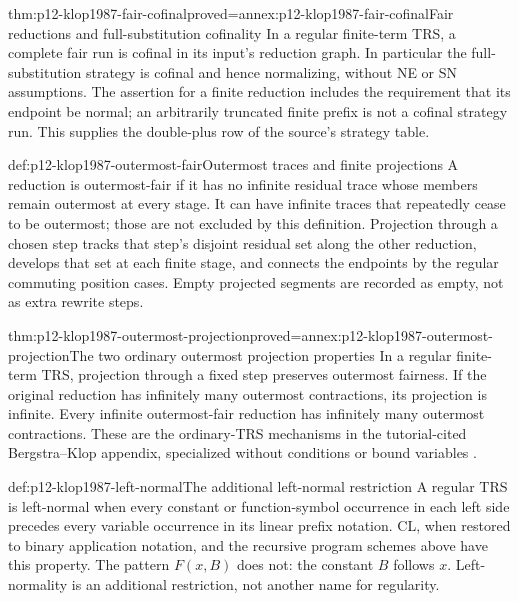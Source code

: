 \begin{hbtheorem}{thm:p12-klop1987-fair-cofinal}{proved=annex:p12-klop1987-fair-cofinal}{Fair reductions and full-substitution cofinality}
In a regular finite-term TRS, a complete fair run is cofinal in its input's
reduction graph. In particular the full-substitution strategy is cofinal
and hence normalizing, without NE or SN assumptions. The assertion for
a finite reduction includes the requirement that its endpoint be normal;
an arbitrarily truncated finite prefix is not a cofinal strategy run.
This supplies the double-plus row of the source's strategy table.
\end{hbtheorem}

\begin{hbdefinition}{def:p12-klop1987-outermost-fair}{Outermost traces and finite projections}
A reduction is outermost-fair if it has no infinite residual trace whose
members remain outermost at every stage. It can have infinite traces
that repeatedly cease to be outermost; those are not excluded by this
definition. Projection through a chosen step tracks that step's disjoint
residual set along the other reduction, develops that set at each finite
stage, and connects the endpoints by the regular commuting position cases.
Empty projected segments are recorded as empty, not as extra rewrite steps.
\end{hbdefinition}

\begin{hblemma}{thm:p12-klop1987-outermost-projection}{proved=annex:p12-klop1987-outermost-projection}{The two ordinary outermost projection properties}
In a regular finite-term TRS, projection through a fixed step preserves
outermost fairness. If the original reduction has infinitely many
outermost contractions, its projection is infinite. Every infinite
outermost-fair reduction has infinitely many outermost contractions.
These are the ordinary-TRS mechanisms in the tutorial-cited
Bergstra--Klop appendix, specialized without conditions or bound variables
\parencite[pp.352--360]{BergstraKlop1986StrategyAppendix}.
\end{hblemma}

\begin{hbdefinition}{def:p12-klop1987-left-normal}{The additional left-normal restriction}
A regular TRS is left-normal when every constant or function-symbol
occurrence in each left side precedes every variable occurrence in its
linear prefix notation. CL, when restored to binary application notation,
and the recursive program schemes above have this property.
The pattern \(F(x,B)\) does not: the constant \(B\) follows \(x\).
Left-normality is an additional restriction, not another name for regularity.
\end{hbdefinition}

